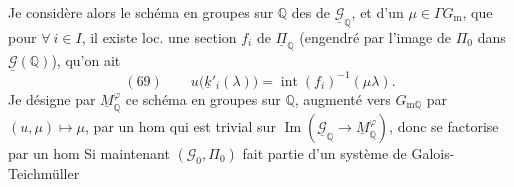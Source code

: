 Je considère alors le schéma en groupes sur $\mathbb Q$ des   de $\underline{\mathcal{G}}_{\mathbb Q}$, et d'un $\mu\in\Gamma G_{\mathrm m}$,  que pour $\forall\ i\in I$,  il existe loc. une section $f_i$ de $\underline{\Pi}_{\mathbb Q}$ (engendré par l'image de $\Pi_0$ dans $\underline{\mathcal{G}}(\mathbb Q)$),  qu'on ait
\[
(69)\qquad u\bigl(\underline{k}'_i(\lambda)\bigr)=\operatorname{int}(f_i)^{-1}(\mu\lambda).
\]
Je désigne par $\underline{M}_{\mathbb Q}^{\varphi}$ ce schéma en groupes sur $\mathbb Q$, augmenté vers $G_{\mathrm m\mathbb Q}$ par $(u,\mu)\longmapsto\mu$, par un hom qui est trivial sur $\operatorname{Im}(\underline{\mathcal{G}}_{\mathbb Q}\to\underline{M}_{\mathbb Q}^{\varphi})$, donc se factorise par un hom
Si maintenant $(\mathcal{G}_0,\Pi_0)$ fait partie d'un système de Galois-Teichmüller

